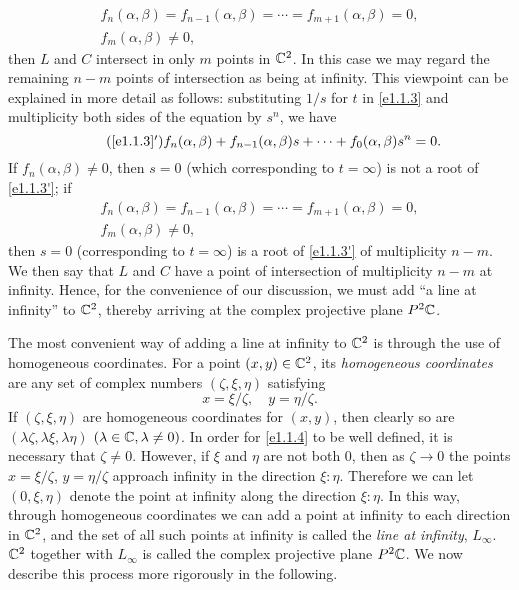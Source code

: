 \begin{gather*}
    f_n(\alpha,\beta)=f_{n-1}(\alpha,\beta)=\cdots=f_{m+1}(\alpha,\beta)=0, \\
    f_m(\alpha,\beta)\neq0, 
\end{gather*}
then $L$ and $C$ intersect in only $m$ points in $\mathbb{C}^2$. In this case we may regard the remaining $n-m$ points of intersection as being at infinity. This viewpoint can be explained in more detail as follows: substituting $1/s$ for $t$ in \eqref{e1.1.3} and multiplicity both sides of the equation by $s^n$, we have 
\begin{equation}\label{e1.1.3'}\tag{\ref*{e1.1.3}$'$}
    f_n(\alpha,\beta)+f_{n-1}(\alpha,\beta)s+\cdots+f_0(\alpha,\beta)s^n=0. 
\end{equation}
If $f_n(\alpha,\beta)\neq0$, then $s=0$ (which corresponding to $t=\infty$) is not a root of \eqref{e1.1.3'}; if 
\begin{gather*}
    f_n(\alpha,\beta)=f_{n-1}(\alpha,\beta)=\cdots=f_{m+1}(\alpha,\beta)=0, \\
    f_m(\alpha,\beta)\neq0, 
\end{gather*}
then $s=0$ (corresponding to $t=\infty$) is a root of \eqref{e1.1.3'} of multiplicity $n-m$. We then say that $L$ and $C$ have a point of intersection of multiplicity $n-m$ at infinity. Hence, for the convenience of our discussion, we must add ``a line at infinity'' to $\mathbb{C}^2$, thereby arriving at the complex projective plane $P^2\mathbb{C}$. 

The most convenient way of adding a line at infinity to $\mathbb{C}^2$ is through the use of homogeneous coordinates. For a point $(x,y)\in\mathbb{C}^2$, its \textit{homogeneous coordinates} are any set of complex numbers $(\zeta,\xi,\eta)$ satisfying 
\begin{equation}\label{e1.1.4}
    x=\xi/\zeta, \quad y=\eta/\zeta. 
\end{equation}
If $(\zeta,\xi,\eta)$ are homogeneous coordinates for $(x,y)$, then clearly so are $(\lambda\zeta,\lambda\xi,\lambda\eta)$ $(\lambda\in\mathbb{C},\lambda\neq0)$. In order for \eqref{e1.1.4} to be well defined, it is necessary that $\zeta\neq0$. However, if $\xi$ and $\eta$ are not both $0$, then as $\zeta\to0$ the points $x=\xi/\zeta$, $y=\eta/\zeta$ approach infinity in the direction $\xi:\eta$. Therefore we can let $(0,\xi,\eta)$ denote the point at infinity along the direction $\xi:\eta$. In this way, through homogeneous coordinates we can add a point at infinity to each direction in $\mathbb{C}^2$, and the set of all such points at infinity is called the \textit{line at infinity}, $L_\infty$. $\mathbb{C}^2$ together with $L_\infty$ is called the complex projective plane $P^2\mathbb{C}$. We now describe this process more rigorously in the following. 

